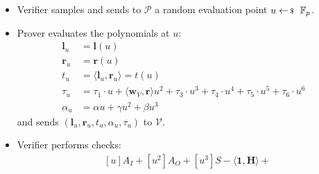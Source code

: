 \documentclass[../lecture-notes-148x210.tex]{subfiles}
\begin{document}
\begin{definition}
\begin{itemize}
        \begin{equation*}
            \begin{aligned}
                T_1 &= [t_1]G + [\tau_1]B\\
                T_3 &= [t_3]G + [\tau_3]B\\
                T_4 &= [t_4]G + [\tau_4]B\\
                T_5 &= [t_5]G + [\tau_5]B\\
                T_6 &= [t_6]G + [\tau_6]B
            \end{aligned}
        \end{equation*}
        \textbf{Note:} The prover does not send a separate commitment to $t_2$, as the verifier could derive it from $\mathbf{V}$ and the circuit public parameters:
        \begin{align*}
            t_2 &= w_c + \langle \mathbf{w}_V, \mathbf{v} \rangle + \delta(y, z) \\
            T_2 &= \langle \mathbf{w}_V, \mathbf{V} \rangle + [\delta(y, z) + w_c]G
        \end{align*}
        \item Verifier samples and sends to $\mathcal{P}$ a random evaluation point $u \leftarrowS \mathbb{F}_p$.
        \item Prover evaluates the polynomials at $u$:
            \begin{equation*}
                \begin{aligned}
                    \mathbf{l}_u &= \mathbf{l}(u) \\
                    \mathbf{r}_u &= \mathbf{r}(u) \\
                    t_u &= \langle \mathbf{l}_u, \mathbf{r}_u \rangle = t(u) \\
                    \tau_u &= \tau_1 \cdot u + \langle \mathbf{w}_V, \mathbf{r} \rangle u^2 + \tau_3 \cdot u^3 + \tau_4 \cdot u^4 + \tau_5 \cdot u^5 + \tau_6 \cdot u^6\\
                    \alpha_u &= \alpha u + \gamma u^2 + \beta u^3
                \end{aligned}
            \end{equation*}
            and sends $(\mathbf{l}_u, \mathbf{r}_u, t_u, \alpha_u, \tau_u)$ to $\mathcal{V}$.
        \item Verifier performs checks:
            \begin{equation*}
                \begin{aligned}
                    &[u]A_I + [u^2]A_O + [u^3]S - \langle \mathbf{1}, \mathbf{H} \rangle + \\

\end{aligned}
\end{equation*}
\end{itemize}
\end{definition}
\end{document}
